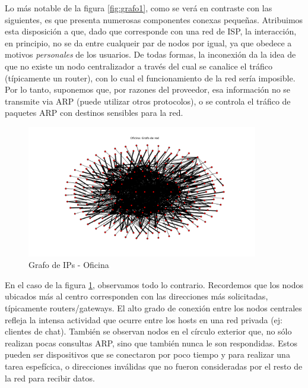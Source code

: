 Lo más notable de la figura \ref{fig:grafo1}, como se verá en contraste con las siguientes, es que presenta numerosas componentes conexas pequeñas. Atribuimos esta disposición a que, dado que corresponde con una red de ISP, la interacción, en principio, no se da entre cualqueir par de nodos por igual, ya que obedece a motivos \emph{personales} de los usuarios. De todas formas, la inconexión da la idea de que no existe un nodo centralizador a través del cual se canalice el tráfico (típicamente un router), con lo cual el funcionamiento de la red sería imposible. Por lo tanto, suponemos que, por razones del proveedor, esa información no se transmite via ARP (puede utilizar otros protocolos), o se controla el tráfico de paquetes ARP con destinos sensibles para la red.

\begin{figure}[H]
  \centering
    \includegraphics[width=0.9\textwidth]{graficos/grafoOficina.png}
    \caption{Grafo de IPs - Oficina}
    \label{fig:grafo2}
\end{figure}

En el caso de la figura \ref{fig:grafo2}, observamos todo lo contrario. Recordemos que los nodos ubicados más al centro corresponden con las direcciones más solicitadas, típicamente routers/gateways. El alto grado de conexión entre  los nodos centrales refleja la intensa actividad que ocurre entre los hosts en una red privada (ej: clientes de chat). También se observan nodos en el círculo exterior que, no sólo realizan pocas consultas ARP, sino que también nunca le son respondidas. Estos pueden ser dispositivos que se conectaron por poco tiempo y para realizar una tarea espefícica, o direcciones inválidas que no fueron consideradas por el resto de la red para recibir datos.

